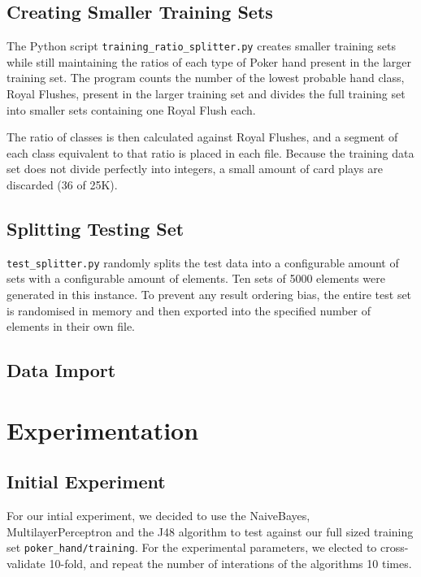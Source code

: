 \documentclass[11pt, a4paper]{article}
\begin{document}
\subsection*{Creating Smaller Training Sets}

The Python script \texttt{training\_ratio\_splitter.py} creates smaller training sets while still maintaining the ratios of each type of Poker hand present in the larger training set. The program counts the number of the lowest probable hand class, Royal Flushes,  present in the larger training set and divides the full training set into smaller sets containing one Royal Flush each.

The ratio of classes is then calculated against Royal Flushes, and a segment of each class equivalent to that ratio is placed in each file. Because the training data set does not divide perfectly into integers, a small amount of card plays are discarded (36 of 25K). 

\subsection*{Splitting Testing Set}

\texttt{test\_splitter.py} randomly splits the test data into a configurable amount of sets with a configurable amount of elements. Ten sets of 5000 elements were generated in this instance. To prevent any result ordering bias, the entire test set is randomised in memory and then exported into the specified number of elements in their own file.

\subsection*{Data Import}

\section*{Experimentation}

\subsection*{Initial Experiment}

For our intial experiment, we decided to use the NaiveBayes, MultilayerPerceptron and the J48 algorithm to test against our full sized training set \texttt{poker\_hand/training}. For the experimental parameters, we elected to cross-validate 10-fold, and repeat the number of interations of the algorithms 10 times.
\end{document}
